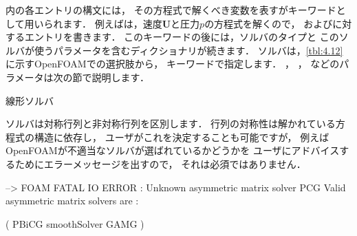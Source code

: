 内の各エントリの構文には，
その方程式で解くべき変数を表すがキーワードとして用いられます．
例えばは，速度$\bm{U}$と圧力$p$の方程式を解くので，
およびに対するエントリを書きます．
このキーワードの後には，ソルバのタイプと
このソルバが使うパラメータを含むディクショナリが続きます．
ソルバは，\autoref{tbl:4.12}に示すOpenFOAMでの選択肢から，
%
%
キーワードで指定します．
%
%
，
%
%
，
%
%
などのパラメータは次の節で説明します．


\begin{table}[ht]
 
 \caption{線形ソルバ}
 \label{tbl:4.12}
\end{table}


ソルバは対称行列と非対称行列を区別します．
行列の対称性は解かれている方程式の構造に依存し，
ユーザがこれを決定することも可能ですが，
例えばOpenFOAMが不適当なソルバが選ばれているかどうかを
ユーザにアドバイスするためにエラーメッセージを出すので，
それは必須ではありません．
\begin{OFverbatim}[terminal]
--> FOAM FATAL IO ERROR : Unknown asymmetric matrix solver PCG
Valid asymmetric matrix solvers are :

(
PBiCG
smoothSolver
GAMG
)
\end{OFverbatim}

